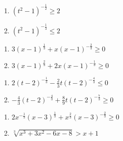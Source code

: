 \documentclass{ximera}
\begin{document}
\begin{multicols}{2}
\begin{enumerate}
\setcounter{enumi}{\value{HW}}


\item  $(t^2-1)^{-\frac{1}{2}} \geq 2$  %
\item   $(t^2-1)^{-\frac{1}{3}} \leq 2$  %

\setcounter{HW}{\value{enumi}}
\end{enumerate}
\end{multicols}

\begin{multicols}{2}
\begin{enumerate}
\setcounter{enumi}{\value{HW}}


\item  $3(x-1)^{\frac{1}{3}} +x (x-1)^{-\frac{2}{3}} \geq 0$ %

\item $3(x-1)^{\frac{2}{3}} +2x (x-1)^{-\frac{1}{3}} \geq 0$ %

\setcounter{HW}{\value{enumi}}
\end{enumerate}
\end{multicols}


\begin{multicols}{2}
\begin{enumerate}
\setcounter{enumi}{\value{HW}}


\item  $2 (t-2)^{-\frac{1}{3}} -\frac{2}{3} t(t-2)^{-\frac{4}{3}} \leq 0$ 
\item  $-\frac{4}{3} (t-2)^{-\frac{4}{3}} + \frac{8}{9} t (t-2)^{-\frac{7}{3}} \geq 0$

\setcounter{HW}{\value{enumi}}
\end{enumerate}
\end{multicols}

\begin{multicols}{2}
\begin{enumerate}
\setcounter{enumi}{\value{HW}}


\item  $2x^{-\frac{1}{3}}(x-3)^{\frac{1}{3}} + x^{\frac{2}{3}} (x-3)^{-\frac{2}{3}} \geq 0$
\item $\sqrt[3]{x^{3} + 3x^{2} - 6x - 8} > x + 1$ 


\setcounter{HW}{\value{enumi}}
\end{enumerate}
\end{multicols}
\end{document}
